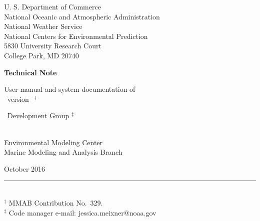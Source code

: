 
\pagestyle{empty}

\begin{center} 
U. S. Department of Commerce \\
National Oceanic and Atmospheric Administration \\
National Weather Service \\
National Centers for Environmental Prediction \\
5830 University Research Court \\
College Park, MD 20740


\vspace{15mm}

{\bf Technical Note}

\vspace{15mm}

{\large User manual and system documentation of \\
\ww\ version \WWver\ $^\dag$} \\

\vspace{15mm}

\ww\ Development Group $^\ddag$ \\
\strut \\
Environmental Modeling Center \\
Marine Modeling and Analysis Branch

\vfill

 October 2016 \\


\vfill

\end{center}
\noindent \rule{140mm}{0.5mm} \\
{\small $^\dag$ MMAB Contribution No.~329. \\
$^\ddag$ Code manager e-mail: jessica.meixner@noaa.gov}

